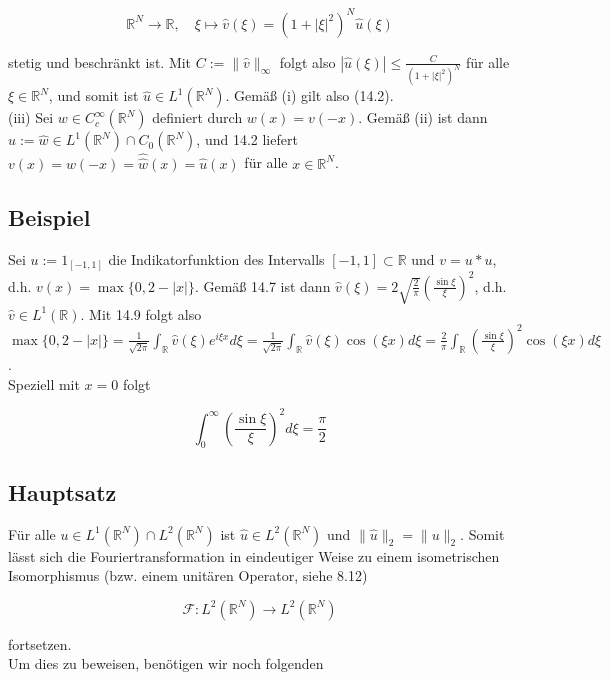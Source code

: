 \documentclass[10pt, letterpaper]{article}
\begin{document}
$$
\mathbb{R}^{N} \rightarrow \mathbb{R}, \quad \xi \mapsto \hat{v}(\xi)=\left(1+|\xi|^{2}\right)^{N} \hat{u}(\xi)
$$

stetig und beschränkt ist. Mit $C:=\|\hat{v}\|_{\infty}$ folgt also $|\hat{u}(\xi)| \leq \frac{C}{\left(1+|\xi|^{2}\right)^{N}}$ für alle $\xi \in \mathbb{R}^{N}$, und somit ist $\hat{u} \in L^{1}\left(\mathbb{R}^{N}\right)$. Gemäß (i) gilt also (14.2).\\
(iii) Sei $w \in C_{c}^{\infty}\left(\mathbb{R}^{N}\right)$ definiert durch $w(x)=v(-x)$. Gemäß (ii) ist dann $u:= \hat{w} \in L^{1}\left(\mathbb{R}^{N}\right) \cap C_{0}\left(\mathbb{R}^{N}\right)$, und 14.2 liefert $v(x)=w(-x)=\hat{\hat{w}}(x)=\hat{u}(x)$ für alle $x \in \mathbb{R}^{N}$.

\subsection*{Beispiel}
Sei $u:=1_{[-1,1]}$ die Indikatorfunktion des Intervalls $[-1,1] \subset \mathbb{R}$ und $v=u * u$, d.h. $v(x)=\max \{0,2-|x|\}$. Gemäß 14.7 ist dann $\hat{v}(\xi)=2 \sqrt{\frac{2}{\pi}}\left(\frac{\sin \xi}{\xi}\right)^{2}$, d.h. $\hat{v} \in L^{1}(\mathbb{R})$. Mit 14.9 folgt also\\
$\max \{0,2-|x|\}=\frac{1}{\sqrt{2 \pi}} \int_{\mathbb{R}} \hat{v}(\xi) e^{i \xi x} d \xi=\frac{1}{\sqrt{2 \pi}} \int_{\mathbb{R}} \hat{v}(\xi) \cos (\xi x) d \xi=\frac{2}{\pi} \int_{\mathbb{R}}\left(\frac{\sin \xi}{\xi}\right)^{2} \cos (\xi x) d \xi$.\\
Speziell mit $x=0$ folgt

$$
\int_{0}^{\infty}\left(\frac{\sin \xi}{\xi}\right)^{2} d \xi=\frac{\pi}{2}
$$

\subsection*{Hauptsatz}
Für alle $u \in L^{1}\left(\mathbb{R}^{N}\right) \cap L^{2}\left(\mathbb{R}^{N}\right)$ ist $\hat{u} \in L^{2}\left(\mathbb{R}^{N}\right)$ und $\|\hat{u}\|_{2}=\|u\|_{2}$. Somit lässt sich die Fouriertransformation in eindeutiger Weise zu einem isometrischen Isomorphismus (bzw. einem unitären Operator, siehe 8.12)

$$
\mathcal{F}: L^{2}\left(\mathbb{R}^{N}\right) \rightarrow L^{2}\left(\mathbb{R}^{N}\right)
$$

fortsetzen.\\
Um dies zu beweisen, benötigen wir noch folgenden
\end{document}
